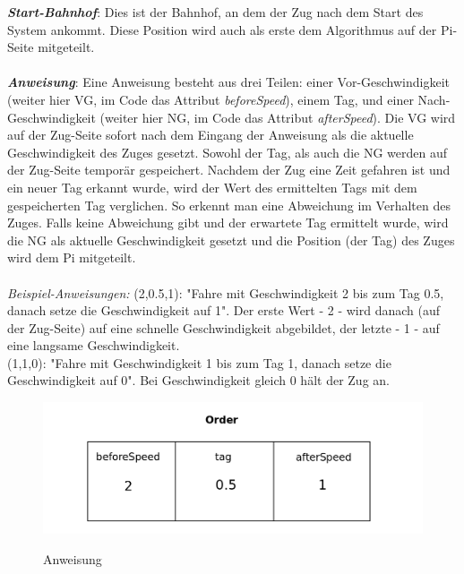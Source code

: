 \noindent
\textit{\textbf{Start-Bahnhof}}: Dies ist der Bahnhof, an dem der Zug nach dem Start des System ankommt. Diese Position wird auch als erste dem Algorithmus auf der Pi-Seite mitgeteilt.\\
\\
\textit{\textbf{Anweisung}}: Eine Anweisung besteht aus drei Teilen: einer Vor-Geschwindigkeit (weiter hier VG, im Code das Attribut \textit{beforeSpeed}), einem Tag, und einer Nach-Geschwindigkeit (weiter hier NG, im Code das Attribut \textit{afterSpeed}). Die VG wird auf der Zug-Seite sofort nach dem Eingang der Anweisung als die aktuelle Geschwindigkeit des Zuges gesetzt. Sowohl der Tag, als auch die NG werden auf der Zug-Seite temporär gespeichert. Nachdem der Zug eine Zeit gefahren ist und ein neuer Tag erkannt wurde, wird der Wert des ermittelten Tags mit dem gespeicherten Tag verglichen. So erkennt man eine Abweichung im Verhalten des Zuges. Falls keine Abweichung gibt und der erwartete Tag ermittelt wurde, wird die NG als aktuelle Geschwindigkeit gesetzt und die Position (der Tag) des Zuges wird dem Pi mitgeteilt.\\ 
\\
\textit{Beispiel-Anweisungen:} (2,0.5,1): "Fahre mit Geschwindigkeit 2 bis zum Tag 0.5, danach setze die Geschwindigkeit auf 1". Der erste Wert - 2 - wird danach (auf der Zug-Seite) auf eine schnelle Geschwindigkeit abgebildet, der letzte - 1 - auf eine langsame Geschwindigkeit.\\
(1,1,0): "Fahre mit Geschwindigkeit 1 bis zum Tag 1, danach setze die Geschwindigkeit auf 0". Bei Geschwindigkeit gleich 0 hält der Zug an.\\
\begin{figure}[H]	
\caption{Anweisung}
\includegraphics[width=2\textwidth, width=330pt]{content/images/order.png}
\label{pic:anweisung}
\end{figure}
\noindent
%
